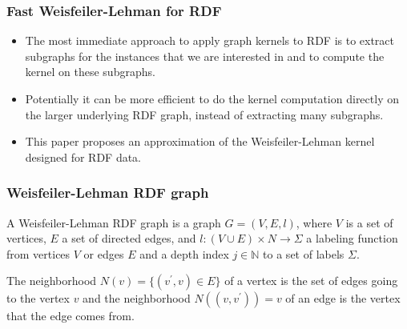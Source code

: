 \documentclass{beamer}
\begin{document}

\begin{frame}
\frametitle{Fast Weisfeiler-Lehman for RDF}

\begin{itemize}
\item
The most immediate approach to apply graph kernels to RDF is to extract subgraphs for the instances that we are interested in and to compute the kernel on these subgraphs.

\item
Potentially it can be more efficient to do the kernel computation directly on the larger underlying RDF graph, instead of extracting many subgraphs.

\item
This paper proposes an approximation of the Weisfeiler-Lehman kernel designed for RDF data.
\end{itemize}

\end{frame}


\begin{frame}
\frametitle{Weisfeiler-Lehman RDF graph}

\begin{definition}
A Weisfeiler-Lehman RDF graph is a graph $G = (V, E, l)$, where $V$ is a set of vertices, $E$ a set of directed edges, and $l:(V \cup E) \times N \rightarrow \Sigma$ a labeling function from vertices $V$ or edges $E$ and a depth index $j \in \mathbb{N}$ to a set of labels $\Sigma$.
\end{definition}

\begin{definition}[Neighborhood]
The neighborhood $N(v) = \{(v^\prime, v) \in E\}$ of a vertex is the set of edges going to the vertex $v$ and the neighborhood $N((v, v^\prime)) = {v}$ of an edge is the vertex that the edge comes from.
\end{definition}

\end{frame}
\end{document}
